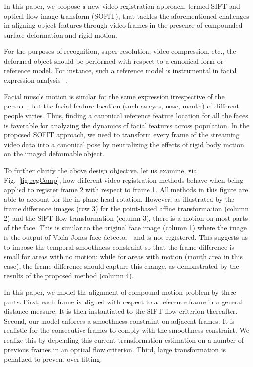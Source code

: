 \documentclass[10pt,journal]{IEEEtran}
\begin{document}
In this paper, we propose a new video registration approach, termed SIFT and optical flow image transform (SOFIT), that tackles the aforementioned challenges in aligning object features through video frames in the presence of compounded surface deformation and rigid motion.

For the purposes of recognition, super-resolution, video compression, etc., the deformed object should be performed with respect to a canonical form or reference model.
For instance, such a reference model is instrumental in facial expression analysis ~\cite{Yang_SMCB12}.

Facial muscle motion is similar for the same expression irrespective of the person~\cite{Ekman78}, but the facial feature location (such as eyes, nose, mouth) of different people varies. Thus, finding a canonical reference feature location for all the faces is favorable for analyzing the dynamics of facial features across population. In the proposed SOFIT approach, we need to transform every frame of the streaming video data into a canonical pose by neutralizing the effects of rigid body motion on the imaged deformable object.

To further clarify the above design objective, let us examine, via Fig.~\ref{fig:regComp}, how different video registration methods behave when being applied to register frame 2 with respect to frame 1.  All methods in this figure are able to account for the in-plane head rotation. However, as illustrated by the frame difference images (row 3) for the point-based affine transformation (column 2) and the SIFT flow transformation (column 3), there is a motion on most parts of the face. This is similar to the original face image (column 1) where the image is the output of Viola-Jones face detector~\cite{Viola_IJCV04} and is not registered. This suggests us to impose the temporal smoothness constraint so that the frame difference is small for areas with no motion; while for areas with motion (mouth area in this case), the frame difference should capture this change, as demonstrated by the results of the proposed method (column 4).

In this paper, we model the alignment-of-compound-motion problem by three parts. First, each frame is aligned with respect to a reference frame in a general distance measure. It is then instantiated to the SIFT flow criterion thereafter. Second, our model enforces a smoothness constraint on adjacent frames. It is realistic for the consecutive frames to comply with the smoothness constraint. We realize this by depending this current transformation estimation on a number of previous frames in an optical flow criterion. Third, large transformation is penalized to prevent over-fitting. 
\end{document}
